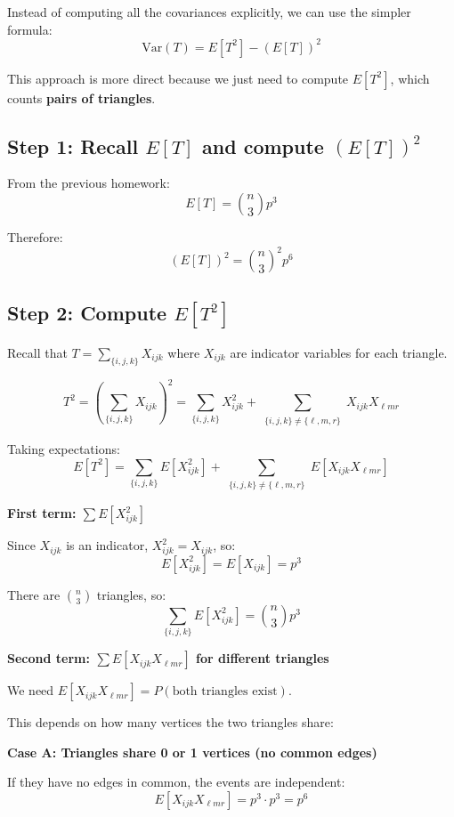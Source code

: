\documentclass[11pt]{article}
\begin{document}
Instead of computing all the covariances explicitly, we can use the simpler formula:
\[
\text{Var}(T) = E[T^2] - (E[T])^2
\]

This approach is more direct because we just need to compute $E[T^2]$, which counts \textbf{pairs of triangles}.

\subsection*{Step 1: Recall $E[T]$ and compute $(E[T])^2$}

From the previous homework:
\[
E[T] = \binom{n}{3} p^3
\]

Therefore:
\[
(E[T])^2 = \binom{n}{3}^2 p^6
\]

\subsection*{Step 2: Compute $E[T^2]$}

Recall that $T = \sum_{\{i,j,k\}} X_{ijk}$ where $X_{ijk}$ are indicator variables for each triangle.

\[
T^2 = \left(\sum_{\{i,j,k\}} X_{ijk}\right)^2 = \sum_{\{i,j,k\}} X_{ijk}^2 + \sum_{\substack{\{i,j,k\} \neq \{\ell,m,r\}}} X_{ijk} X_{\ell mr}
\]

Taking expectations:
\[
E[T^2] = \sum_{\{i,j,k\}} E[X_{ijk}^2] + \sum_{\substack{\{i,j,k\} \neq \{\ell,m,r\}}} E[X_{ijk} X_{\ell mr}]
\]

\vspace{0.5em}

\textbf{First term: $\sum E[X_{ijk}^2]$}

Since $X_{ijk}$ is an indicator, $X_{ijk}^2 = X_{ijk}$, so:
\[
E[X_{ijk}^2] = E[X_{ijk}] = p^3
\]

There are $\binom{n}{3}$ triangles, so:
\[
\sum_{\{i,j,k\}} E[X_{ijk}^2] = \binom{n}{3} p^3
\]

\vspace{0.5em}

\textbf{Second term: $\sum E[X_{ijk} X_{\ell mr}]$ for different triangles}

We need $E[X_{ijk} X_{\ell mr}] = P(\text{both triangles exist})$.

This depends on how many vertices the two triangles share:

\vspace{0.3em}

\textbf{Case A: Triangles share 0 or 1 vertices (no common edges)}

If they have no edges in common, the events are independent:
\[
E[X_{ijk} X_{\ell mr}] = p^3 \cdot p^3 = p^6
\]
\end{document}
